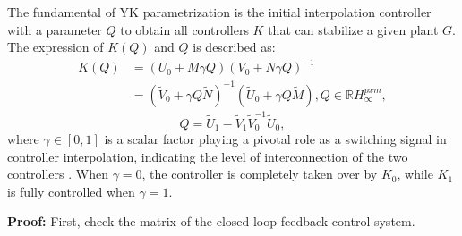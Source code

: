 \documentclass[trsc,nonblindrev]{informs3} %
\begin{document}
The fundamental of YK parametrization is the initial interpolation controller with a parameter $Q$ to obtain all controllers $K$ that can stabilize a given plant $G$. The expression of $K(Q)$ and $Q$ is described as:
\begin{equation}
    \begin{aligned}
        K(Q) & =  \left(U_{0}+M \gamma Q\right)\left(V_{0}+N \gamma Q\right)^{-1}                                                                     \\
             & =\left(\tilde{V}_{0}+\gamma Q \tilde{N}\right)^{-1}\left(\tilde{U}_{0}+\gamma Q \tilde{M}\right), Q \in \mathbb{R} H_{\infty}^{p x m},
    \end{aligned}
\end{equation}
\begin{equation}
    Q=\tilde{U}_{1}-\tilde{V}_{1} \tilde{V}_{0}^{-1} \tilde{U}_{0},
    \label{Eq20}
\end{equation}
where $\gamma \in [0,1]$ is a scalar factor playing a pivotal role as a switching signal in controller interpolation, indicating the level of interconnection of the two controllers \citep{niemann1999architecture}. When $\gamma=0$, the controller is completely taken over by $K_0$, while $K_1$ is fully controlled when $\gamma=1$.

\textbf{Proof:} First, check the matrix of the closed-loop feedback control system.
\end{document}
